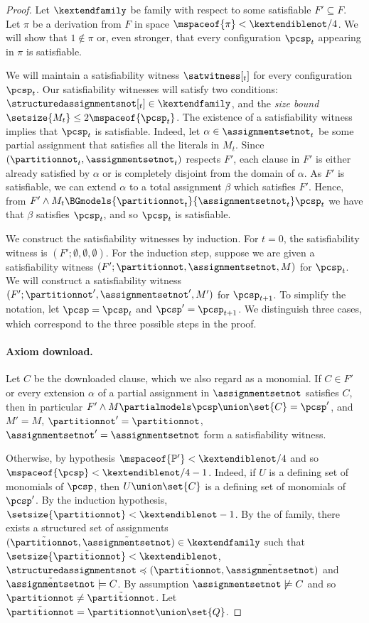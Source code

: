 \documentclass[11pt]{article}
\numberwithin{equation}{section}
\theoremstyle{definition}
\theoremstyle{plain}
\begin{document}
\begin{proof}
  Let $\kextendfamily$ be \akextendible family with respect to some satisfiable $F'\subseteq F$. Let $\pi$ be a derivation from $F$ in space $\mspaceof{\pi}< \kextendiblenot/4$. We will show that $1 \notin\pi$ or, even stronger, that every configuration $\pcsp_t$ appearing in $\pi$ is satisfiable.

  We will maintain a satisfiability witness $\satwitness[_t]$ for every configuration $\pcsp_t$. Our satisfiability witnesses will satisfy two conditions: $\structuredassignmentsnot[_t] \in \kextendfamily$, and the \emph{size bound} $\setsize{M_t} \leq 2\mspaceof{\pcsp_t}$. The existence of a satisfiability witness implies that $\pcsp_t$ is satisfiable. Indeed, let $\alpha \in \assignmentsetnot_t$ be some partial assignment that satisfies all the literals in $M_t$. Since $(\partitionnot_t,\assignmentsetnot_t)$ respects $F'$, each clause in $F'$ is either already satisfied by $\alpha$ or is completely disjoint from the domain of $\alpha$. As $F'$ is satisfiable, we can extend $\alpha$ to a total assignment $\beta$ which satisfies $F'$. Hence, from $F' \land M_t \BGmodels{\partitionnot_t}{\assignmentsetnot_t} \pcsp_t$ we have that $\beta$ satisfies $\pcsp_t$, and so $\pcsp_t$ is satisfiable.

  We construct the satisfiability witnesses by induction. For $t = 0$, the satisfiability witness is $(F';\emptyset,\emptyset,\emptyset)$. For the induction step, suppose we are given a satisfiability witness $(F';\partitionnot,\assignmentsetnot,M)$ for $\pcsp_t$. We will construct a satisfiability witness $(F';\partitionnot',\assignmentsetnot',M')$ for $\pcsp_{t+1}$. To simplify the notation, let $\pcsp=\pcsp_t$ and $\pcsp'=\pcsp_{t+1}$. We distinguish three cases, which correspond to the three possible steps in the proof.

%
%
%
\paragraph{Axiom download.} Let $C$ be the downloaded clause, which we also regard as a monomial. If $C\in F'$ or every extension $\alpha$ of a partial assignment in $\assignmentsetnot$ satisfies $C$, then in particular $F'\land M \partialmodels \pcsp\union\set{C}=\pcsp'$, and $M'=M$, $\partitionnot'=\partitionnot$, $\assignmentsetnot'=\assignmentsetnot$ form a satisfiability witness.

Otherwise, by hypothesis $\mspaceof{\mathbb{P'}}< \kextendiblenot/4$ and so $\mspaceof{\pcsp}<\kextendiblenot/4-1$. Indeed, if $U$ is a %
defining set of monomials
of $\pcsp$, then $U\union\set{C}$ is a %
defining set of monomials
of $\pcsp'$. By the induction hypothesis, $\setsize{\partitionnot}<\kextendiblenot-1$. By the \extensionproperty of \kextendibleNok family, there exists a structured set of assignments $(\tilde{\partitionnot},\tilde{\assignmentsetnot})\in\kextendfamily$ such that $\setsize{\tilde{\partitionnot}}< \kextendiblenot$, $\structuredassignmentsnot\preccurlyeq(\tilde{\partitionnot},\tilde{\assignmentsetnot})$ and $\tilde{\assignmentsetnot}\models C$. By assumption $\assignmentsetnot\not\models C$ and so $\partitionnot\neq\tilde{\partitionnot}$. Let $\tilde{\partitionnot} = \partitionnot \union \set{Q}$.


\end{proof}
\end{document}
